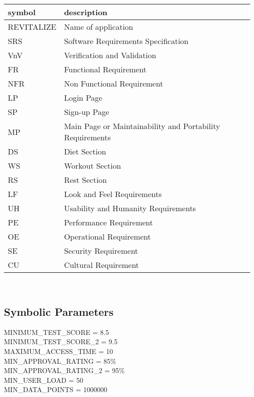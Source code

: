 \documentclass[12pt, titlepage]{article}
\begin{document}
\renewcommand{\arraystretch}{1.2}
\begin{tabular}{l l} 
\toprule		
\textbf{symbol} & \textbf{description}\\
\midrule 
REVITALIZE & Name of application\\
SRS & Software Requirements Specification\\
VnV & Verification and Validation\\
FR & Functional Requirement\\
NFR & Non Functional Requirement\\
LP & Login Page\\
SP & Sign-up Page\\
MP & Main Page or Maintainability and Portability Requirements\\
DS & Diet Section\\
WS & Workout Section\\
RS & Rest Section\\
LF & Look and Feel Requirements\\
UH & Usability and Humanity Requirements\\
PE & Performance Requirement\\
OE & Operational Requirement\\
SE & Security Requirement\\
CU & Cultural Requirement\\
\bottomrule
\end{tabular}\\

\subsection{Symbolic Parameters}

\noindent MINIMUM\_TEST\_SCORE = \hypertarget{MINIMUM_TEST_SCORE}{8.5}\\
MINIMUM\_TEST\_SCORE\_2 = \hypertarget{MINIMUM_TEST_SCORE_2}{9.5}\\
MAXIMUM\_ACCESS\_TIME = \hypertarget{MAXIMUM_ACCESS_TIME}{10}\\
MIN\_APPROVAL\_RATING = \hypertarget{MIN_APPROVAL_RATING}{85\%}\\
MIN\_APPROVAL\_RATING\_2 = \hypertarget{MIN_APPROVAL_RATING_2}{95\%}\\
MIN\_USER\_LOAD = \hypertarget{MIN_USER_LOAD}{50}\\
MIN\_DATA\_POINTS = \hypertarget{MIN_DATA_POINTS}{1000000}

\newpage

\tableofcontents
\end{document}

